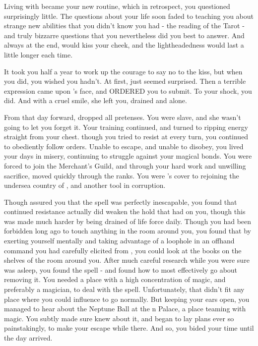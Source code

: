 \documentclass[char]{NeptuneBall}
\begin{document}
Living with \cWitch{\them} became your new routine, which in retrospect, you questioned surprisingly little. The questions about your life soon faded to \cWitch{\them} teaching you about strange new abilities that you didn't know you had - the reading of the Tarot - and truly bizzarre questions that you nevertheless did you best to answer. And always at the end, \cWitch{\they} would kiss your cheek, and the lightheadedness would last a little longer each time.

It took you half a year to work up the courage to say no to the kiss, but when you did, you wished you hadn't. At first, \cWitch{\they} just seemed surprised. Then a terrible expression came upon \cWitch{}'s face, and \cWitch{\they} ORDERED you to submit. To your shock, you did. And with a cruel smile, she left you, drained and alone.

From that day forward, \cWitch{} dropped all pretenses. You were \cWitch{\their} slave, and she wasn't going to let you forget it. Your training continued, and \cWitch{\they} turned to ripping energy straight from your chest. though you tried to resist \cWitch{\them} at every turn, you continued to obediently follow orders. Unable to escape, and unable to disobey, you lived your days in misery, continuing to struggle against your magical bonds. You were forced to join the Merchant's Guild, and through your hard work and unwilling sacrifice, moved quickly through the ranks. You were \cWitch{}'s cover to rejoining the undersea country of \pAtlantis{}, and another tool in \cWitch{\their} corruption.

Though \cWitch{\they} assured you that the spell was perfectly inescapable, you found that continued resistance actually did weaken the hold that \cWitch{\they} had on you, though this was made much harder by being drained of life force daily. Though you had been forbidden long ago to touch anything in the room around you, you found that by exerting yourself mentally and taking advantage of a loophole in an offhand command you had carefully elicited from \cWitch{\them}, you could look at the books on the shelves of the room around you. After much careful research while you were sure \cWitch{} was asleep, you found the spell - and found how to most effectively go about removing it. You needed a place with a high concentration of magic, and preferably a magician, to deal with the spell. Unfortunately, that didn't fit any place where you could influence \cWitch{} to go normally. But keeping your ears open, you managed to hear about the Neptune Ball at the \pAtlantis{}n Palace, a place teaming with magic. You subtly made sure \cWitch{} knew about it, and began to lay plans ever so painstakingly, to make your escape while there. And so, you bided your time until the day arrived.
\end{document}
